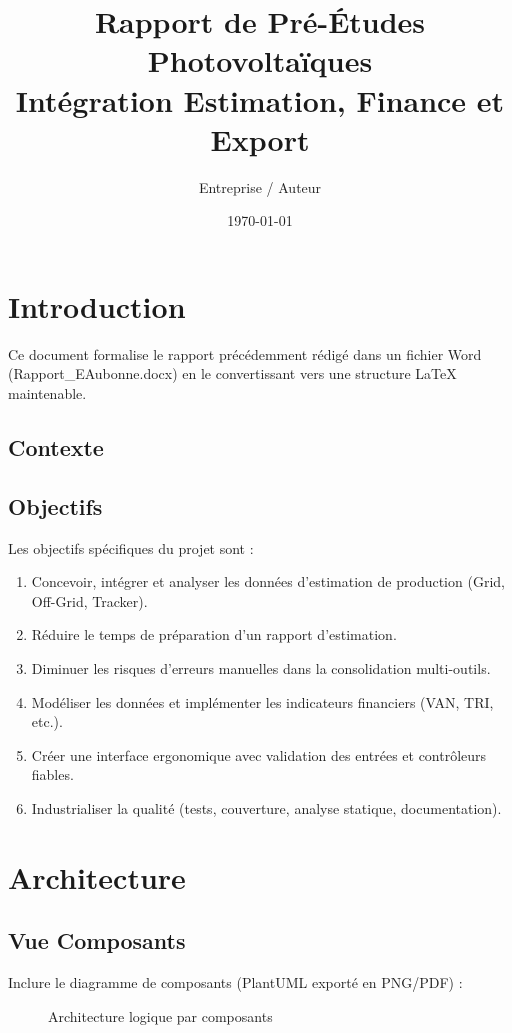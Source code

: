 \documentclass[11pt,a4paper]{report}
\title{Rapport de Pré-Études Photovoltaïques\\\large Intégration Estimation, Finance et Export}
\author{Entreprise / Auteur}
\date{\today}
\begin{document}
\maketitle
\tableofcontents
\chapter{Introduction}
Ce document formalise le rapport précédemment rédigé dans un fichier Word (Rapport\_EAubonne.docx) en le convertissant vers une structure LaTeX maintenable.

\section{Contexte}

\section{Objectifs}
Les objectifs spécifiques du projet sont :
\begin{enumerate}
  \item Concevoir, intégrer et analyser les données d’estimation de production (Grid, Off-Grid, Tracker).
  \item Réduire le temps de préparation d’un rapport d’estimation.
  \item Diminuer les risques d’erreurs manuelles dans la consolidation multi-outils.
  \item Modéliser les données et implémenter les indicateurs financiers (VAN, TRI, etc.).
  \item Créer une interface ergonomique avec validation des entrées et contrôleurs fiables.
  \item Industrialiser la qualité (tests, couverture, analyse statique, documentation).
\end{enumerate}

\chapter{Architecture}
\section{Vue Composants}
Inclure le diagramme de composants (PlantUML exporté en PNG/PDF) :
\begin{figure}[H]
  \centering
  \caption{Architecture logique par composants}
\end{figure}
\end{document}
